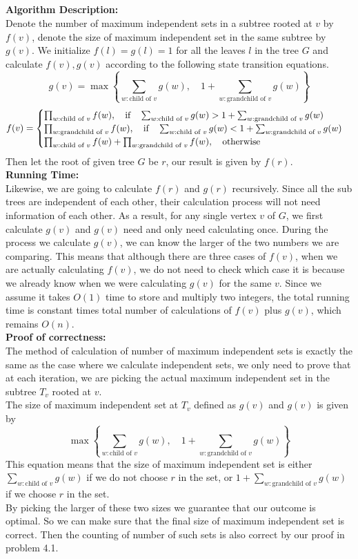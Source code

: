 \documentclass[12pt,letterpaper]{article}
\begin{document}
\newpage
\subsection{}
\textbf{Algorithm Description:}\\
Denote the number of maximum independent sets in a subtree rooted at $v$ by $f(v)$,
denote the size of maximum independent set in the same subtree by $g(v)$.
We initialize $f(l)=g(l)=1$ for all the leaves $l$ in the tree $G$
and calculate $f(v),g(v)$ according to the following state transition equations.\\
$$g(v)=\max\left\{\sum_{w:\text{child of }v}g(w),\quad 1+\sum_{w:\text{grandchild of }v}g(w)\right\}$$
$$f(v)=\begin{cases}
  \prod_{w:\text{child of }v}f(w),\quad \text{if}\quad \sum_{w:\text{child of }v}g(w)>1+\sum_{w:\text{grandchild of }v}g(w)\\
  \prod_{w:\text{grandchild of }v}f(w),\quad \text{if}\quad \sum_{w:\text{child of }v}g(w)<1+\sum_{w:\text{grandchild of }v}g(w)\\
  \prod_{w:\text{child of }v}f(w)+\prod_{w:\text{grandchild of }v}f(w),\text{\quad otherwise}
\end{cases}$$
Then let the root of given tree $G$ be $r$, our result is given by $f(r)$.\\
\textbf{Running Time:}\\
Likewise, we are going to calculate $f(r)$ and $g(r)$ recursively.
Since all the sub trees are independent of each other,
their calculation process will not need information of each other.
As a result, for any single vertex $v$ of $G$,
we first calculate $g(v)$ and 
$g(v)$ need and only need calculating once.
During the process we calculate $g(v)$,
we can know the larger of the two numbers we are comparing.
This means that although there are three cases of $f(v)$,
when we are actually calculating $f(v)$,
we do not need to check which case it is because we already know 
when we were calculating $g(v)$ for the same $v$.
Since we assume it takes $O(1)$ time to store and multiply two integers,
the total running time is constant times total number of calculations of $f(v)$ plus $g(v)$,
which remains $O(n)$.\\ 
\textbf{Proof of correctness:}\\
The method of calculation of number of maximum independent sets is exactly the same 
as the case where we calculate independent sets,
we only need to prove that at each iteration,
we are picking the actual maximum independent set in the subtree $T_v$ rooted at $v$.\\
The size of maximum independent set at $T_v$ defined as $g(v)$ 
and $g(v)$ is given by 
$$\max\left\{\sum_{w:\text{child of }v}g(w),\quad 1+\sum_{w:\text{grandchild of }v}g(w)\right\}$$
This equation means that the size of maximum independent set is
either $\sum_{w:\text{child of }v}g(w)$ if we do not choose $r$ in the set,
or $1+\sum_{w:\text{grandchild of }v}g(w)$ if we choose $r$ in the set.\\
By picking the larger of these two sizes we guarantee that our outcome is optimal.
So we can make sure that the final size of maximum independent set is correct.
Then the counting of number of such sets is also correct by our proof in  problem 4.1.
\newpage
\end{document}
